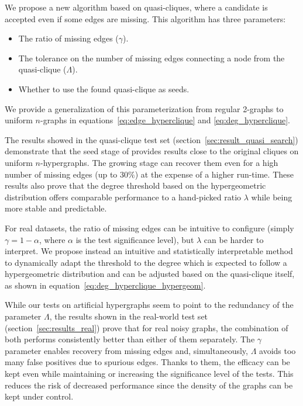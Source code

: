 We propose a new algorithm based on quasi-cliques, where a candidate is accepted
even if some edges are missing. This algorithm has three parameters:

\begin{itemize}
    \item The ratio of missing edges ($\gamma$).
    \item The tolerance on the number of missing edges connecting a node from the quasi-clique ($\Lambda$).
    \item Whether to use the found quasi-clique as seeds.
\end{itemize}

We provide a generalization of this parameterization from regular 2-graphs
\cite{brunato2007effectively} to uniform $n$-graphs in equations~\ref{eq:edge_hyperclique}
and \ref{eq:deg_hyperclique}.

The results showed in the quasi-clique test set (section~\ref{sec:result_quasi_search})
demonstrate that the seed stage of \PresQ provides results close to the original
cliques on uniform $n$-hypergraphs. The growing stage
can recover them even for a high number of missing edges (up to $30\%$) at the expense of a higher run-time.
These results also prove that the degree threshold based on the hypergeometric distribution
offers comparable performance to a hand-picked ratio $\lambda$
while being more stable and predictable.

For real datasets, the ratio of missing edges can be intuitive to configure
(simply $\gamma = 1 - \alpha$, where $\alpha$ is the test significance level), 
but $\lambda$ can be harder to interpret. We propose instead an intuitive and statistically
interpretable method to dynamically adapt the threshold to the degree which is expected
to follow a hypergeometric distribution and can be adjusted based on the quasi-clique
itself, as shown in equation~\ref{eq:deg_hyperclique_hypergeom}.

While our tests on artificial hypergraphs seem to point to the redundancy of the parameter $\Lambda$,
the results shown in the real-world test set (section~\ref{sec:results_real}) prove that for real noisy graphs,
the combination of both performs consistently better than
either of them separately. The $\gamma$ parameter enables recovery from missing edges and,
simultaneously, $\Lambda$ avoids too many false positives due to 
spurious edges. Thanks to them, the efficacy can be kept even while maintaining or 
increasing the significance level of the tests. This reduces the risk of decreased
performance since the density of the graphs can be kept under control.

